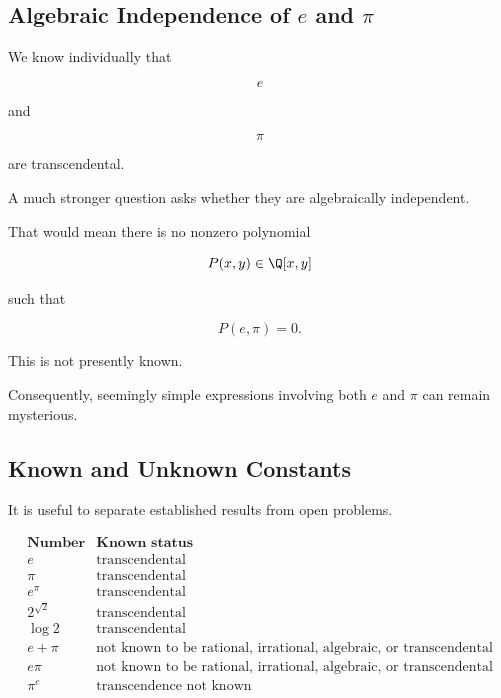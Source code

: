 \subsection{Algebraic Independence of \(e\) and \(\pi\)}
\label{subsec:e-pi-algebraic-independence}

We know individually that

\[ e \]

and

\[ \pi \]

are transcendental.

A much stronger question asks whether they are algebraically independent.

That would mean there is no nonzero polynomial

\[ P(x,y)\in\Q[x,y] \]

such that

\[ P(e,\pi)=0. \]

This is not presently known.

Consequently, seemingly simple expressions involving both \(e\) and \(\pi\)
can remain mysterious.

\subsection{Known and Unknown Constants}
\label{subsec:known-unknown-transcendence}

It is useful to separate established results from open problems.

\[
\begin{array}{c|c}
\textbf{Number} & \textbf{Known status}\\
\hline
e & \text{transcendental}\\
\pi & \text{transcendental}\\
e^\pi & \text{transcendental}\\
2^{\sqrt2} & \text{transcendental}\\
\log2 & \text{transcendental}\\
e+\pi & \text{not known to be rational, irrational, algebraic, or transcendental}\\
e\pi & \text{not known to be rational, irrational, algebraic, or transcendental}\\
\pi^e & \text{transcendence not known}
\end{array}
\]

